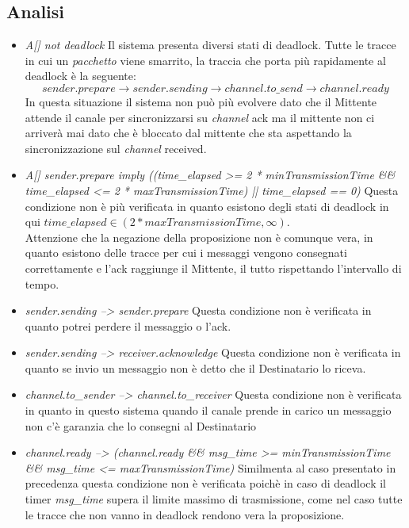 \documentclass[a4paper]{article}
\newcommand{\channel}{\textit{channel }}
\newcommand{\pacchetto}{\textit{pacchetto }}
\begin{document}
\subsection{Analisi}
\begin{itemize}
	\item \textit{A[] not deadlock}
		Il sistema presenta diversi stati di deadlock. Tutte le tracce in cui un \pacchetto viene smarrito, la traccia che porta più rapidamente al deadlock è la seguente:
		$$ sender.prepare \rightarrow sender.sending \rightarrow channel.to\_send \rightarrow channel.ready $$
		In questa situazione il sistema non può più evolvere dato che il Mittente attende il canale per sincronizzarsi su \channel ack ma il mittente non ci arriverà mai dato che è bloccato dal mittente che sta aspettando la sincronizzazione sul \channel received.
	\item \textit{A[] sender.prepare imply ((time\_elapsed >= 2 * minTransmissionTime \&\& time\_elapsed <= 2 * maxTransmissionTime) || time\_elapsed == 0)}
		Questa condizione non è più verificata in quanto esistono degli stati di deadlock in qui $time\_elapsed \in (2 * maxTransmissionTime, \infty)$.\\
		Attenzione che la negazione della proposizione non è comunque vera, in quanto esistono delle tracce per cui i messaggi vengono consegnati correttamente e l'ack raggiunge il Mittente, il tutto rispettando l'intervallo di tempo.
	\item \textit{sender.sending --> sender.prepare}
		Questa condizione non è verificata in quanto potrei perdere il messaggio o l'ack.
	\item \textit{sender.sending --> receiver.acknowledge}
		Questa condizione non è verificata in quanto se invio un messaggio non è detto che il Destinatario lo riceva.
	\item \textit{channel.to\_sender --> channel.to\_receiver}
		Questa condizione non è verificata in quanto in questo sistema quando il canale prende in carico un messaggio non c'è garanzia che lo consegni al Destinatario
	\item \textit{channel.ready --> (channel.ready \&\& msg\_time >= minTransmissionTime \&\& msg\_time <= maxTransmissionTime)}
		Similmenta al caso presentato in precedenza questa condizione non è verificata poichè in caso di deadlock il timer \textit{msg\_time} supera il limite massimo di trasmissione, come nel caso tutte le tracce che non vanno in deadlock rendono vera la proposizione.
\end{itemize}
\end{document}
